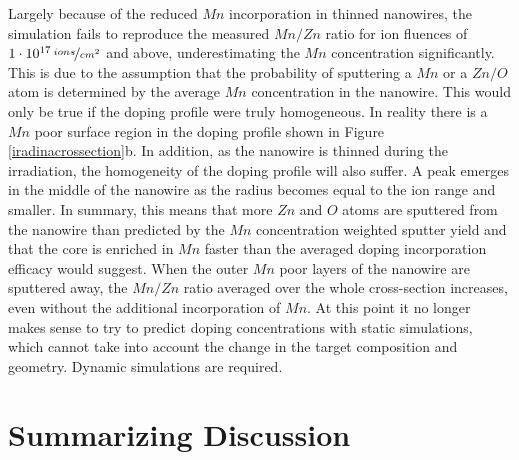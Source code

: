 Largely because of the reduced $Mn$ incorporation in thinned nanowires, the simulation fails to reproduce the measured $Mn/Zn$ ratio for ion fluences of $1\cdot 10^{17}\,\nicefrac{ions}{cm^2}$ and above, underestimating the $Mn$ concentration significantly. This is due to the assumption that the probability of sputtering a $Mn$ or a $Zn/O$ atom is determined by the average $Mn$ concentration in the nanowire. This would only be true if the doping profile were truly homogeneous. In reality there is a $Mn$ poor surface region in the doping profile shown in Figure \ref{iradinacrossection}b. In addition, as the nanowire is thinned during the irradiation, the homogeneity of the doping profile will also suffer. A peak emerges in the middle of the nanowire as the radius becomes equal to the ion range and smaller. In summary, this means that more $Zn$ and $O$ atoms are sputtered from the nanowire than predicted by the $Mn$ concentration weighted sputter yield and that the core is enriched in $Mn$ faster than the averaged doping incorporation efficacy would suggest. When the outer $Mn$ poor layers of the nanowire are sputtered away, the $Mn/Zn$ ratio averaged over the whole cross-section increases, even without the additional incorporation of $Mn$. At this point it no longer makes sense to try to predict doping concentrations with static simulations, which cannot take into account the change in the target composition and geometry. Dynamic simulations are required.
 

\section{Summarizing Discussion}

